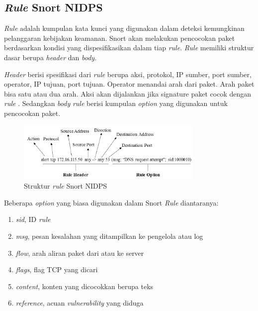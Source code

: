   \subsection{\emph{Rule} Snort NIDPS}

    \emph{Rule} adalah kumpulan kata kunci yang digunakan dalam deteksi kemungkinan pelanggaran kebijakan keamanan. Snort akan melakukan pencocokan paket berdasarkan kondisi yang dispesifikasikan dalam tiap \emph{rule}. \emph{Rule} memiliki struktur dasar berupa \emph{header} dan \emph{body}. 

    \emph{Header} berisi spesifikasi dari  \emph{rule} berupa aksi, protokol, IP sumber, port sumber, operator, IP tujuan, port tujuan. Operator menandai arah dari paket. Arah paket bisa satu atau dua arah. Aksi akan dijalankan jika signature paket cocok dengan \emph{rule} \citep{5358130}. Sedangkan \emph{body} \emph{rule} berisi kumpulan \emph{option} yang digunakan untuk pencocokan paket. 

    \begin{figure}[htb]
      \centering
      \includegraphics[width=0.8\textwidth]{resources/rule.png}
      \caption[Struktur \emph{rule} Snort NIDPS]{Struktur \emph{rule} Snort NIDPS \citep{khamphakdee2014}}
    \end{figure}

    Beberapa \emph{option} yang biasa digunakan dalam Snort \emph{Rule} diantaranya:
    \begin{enumerate} 
      \item \emph{sid}, ID \emph{rule}
      \item \emph{msg}, pesan kesalahan yang ditampilkan ke pengelola atau log
      \item \emph{flow}, arah aliran paket dari atau ke server
      \item \emph{flags}, flag TCP yang dicari
      \item \emph{content}, konten yang dicocokkan berupa teks
      \item \emph{reference}, acuan \emph{vulnerability} yang diduga
    \end{enumerate} 


